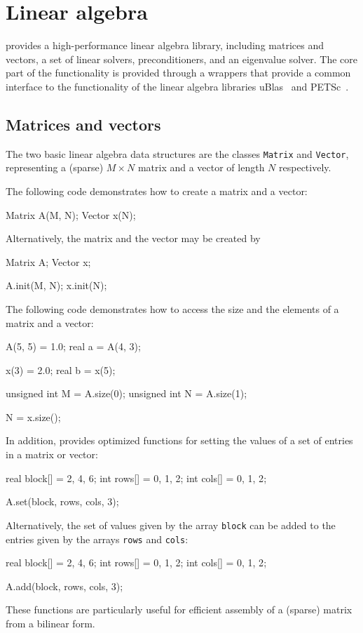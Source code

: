 \chapter{Linear algebra}

\dolfin{} provides a high-performance linear algebra library,
including matrices and vectors, a set of linear solvers,
preconditioners, and an eigenvalue solver. The core part of the
functionality is provided through a wrappers that provide a common
interface to the functionality of the linear algebra libraries
uBlas~\cite{www:ublas} and PETSc~\cite{www:petsc}.

\section{Matrices and vectors}

The two basic linear algebra data structures are the classes
\texttt{Matrix} and \texttt{Vector}, representing a (sparse) $M\times
N$ matrix and a vector of length $N$ respectively.

The following code demonstrates how to create a matrix and a vector:
\begin{code}
Matrix A(M, N);
Vector x(N);
\end{code}
Alternatively, the matrix and the vector may be created by
\begin{code}
Matrix A;
Vector x;

A.init(M, N);
x.init(N);
\end{code}

The following code demonstrates how to access the size and the
elements of a matrix and a vector:
\begin{code}
A(5, 5) = 1.0;
real a = A(4, 3);

x(3) = 2.0;
real b = x(5);

unsigned int M = A.size(0);
unsigned int N = A.size(1);

N = x.size();
\end{code}

In addition, \dolfin{} provides optimized functions for setting the
values of a set of entries in a matrix or vector:
\begin{code}
real block[] = {2, 4, 6};
int rows[] = {0, 1, 2};
int cols[] = {0, 1, 2};
  
A.set(block, rows, cols, 3);
\end{code}
Alternatively, the set of values given by the array \texttt{block} can
be added to the entries given by the arrays \texttt{rows} and
\texttt{cols}:
\begin{code}
real block[] = {2, 4, 6};
int rows[] = {0, 1, 2};
int cols[] = {0, 1, 2};
  
A.add(block, rows, cols, 3);
\end{code}
These functions are particularly useful for efficient assembly of a (sparse)
matrix from a bilinear form.


